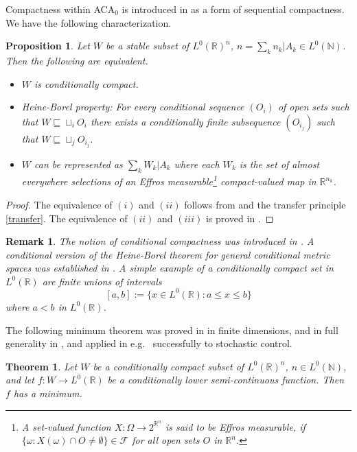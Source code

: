 \documentclass{jloganal}
\numberwithin{equation}{section}
\theoremstyle{plain}
\newtheorem{theorem}[subsection]{Theorem}
\newtheorem{proposition}[subsection]{Proposition}
\newtheorem{remark}[subsection]{Remark}
\renewcommand{\leq}{\leqslant}
\renewcommand\R{\mathbb{R}}
\newcommand\N{\mathbb{N}}
\begin{document}
Compactness within ACA$_0$ is introduced in \cite[Definition III.2.3]{simpson2009subsystems} as a form of sequential compactness.  
We have the following characterization.  
\begin{proposition}\label{p:compact}
Let $W$ be a stable subset of $L^0(\R)^n$, $n=\sum_k n_k|A_k\in L^0(\mathbb{N})$. Then the following are equivalent. 
\begin{itemize}
\item[(i)] $W$ is conditionally compact. 
\item[(ii)] \emph{Heine-Borel property}: For every conditional sequence $(O_i)$ of open sets such that $W\sqsubseteq \sqcup_i O_i$ there exists a conditionally finite subsequence $(O_{i_j})$ such that $W \sqsubseteq \sqcup_j O_{i_j}$.  
\item[(iii)] $W$ can be represented as $\sum_k W_k|A_k$ where each $W_k$ is the set of almost everywhere selections of an Effros measurable\footnote{A set-valued function $X\colon\Omega\to 2^{\R^n}$ is said to be Effros measurable, if $\{\omega\colon X(\omega)\cap O\neq \emptyset\}\in \mathcal{F}$ for all open sets $O$ in $\mathbb{R}^n$.} compact-valued map in $\mathbb{R}^{n_k}$. 
\end{itemize}
\end{proposition}
\begin{proof}
The equivalence of $(i)$ and $(ii)$ follows from \cite[Theorem IV.1.5]{simpson2009subsystems} and the transfer principle \ref{transfer}. 
The equivalence of $(ii)$ and $(iii)$ is proved in \cite[Section 5]{jamneshan2017compact}.  
\end{proof}
\begin{remark}
The notion of conditional compactness was introduced in \cite[Definition 3.24]{drapeau2016algebra}. 
A conditional version of the Heine-Borel theorem for general conditional metric spaces was established in \cite[Theorem 4.6]{drapeau2016algebra}. 
A simple example of a conditionally compact set in $L^0(\mathbb{R})$ are finite unions of intervals  
\[
[a,b]:=\{x\in L^0(\mathbb{R})\colon a\leq x\leq b\}
\]	
where $a<b$ in $L^0(\mathbb{R})$. 
\end{remark}
The following minimum theorem was proved in \cite[Theorem 4.4]{cheridito2015conditional} in finite dimensions, and in full generality  in \cite[Theorem 5.13]{jamneshan2017compact}, and applied in e.g.~\cite{cheridito2016equilibrium,jamneshan2017parameter} successfully to stochastic control.   
\begin{theorem}\label{t:max}
Let $W$ be a conditionally compact subset of $L^0(\mathbb{R})^n$, $n\in L^0(\N)$, and let $f\colon W\to L^0(\mathbb{R})$ be a conditionally lower semi-continuous function.  
Then $f$ has a minimum.  
\end{theorem}
\end{document}

